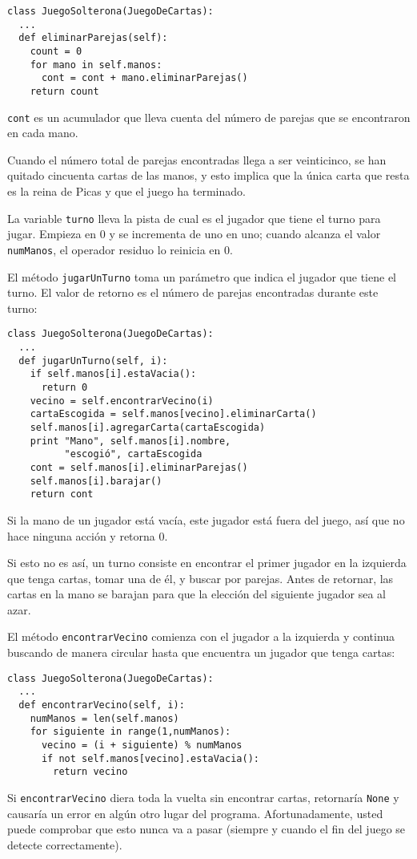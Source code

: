 \beforeverb
\begin{verbatim}
class JuegoSolterona(JuegoDeCartas):
  ...
  def eliminarParejas(self):
    count = 0
    for mano in self.manos:
      cont = cont + mano.eliminarParejas()
    return count
\end{verbatim}
\afterverb
%


\texttt{cont} es un acumulador que lleva cuenta del número
de parejas que se encontraron en cada mano.


Cuando el número total de parejas encontradas llega a ser 
veinticinco, se han quitado cincuenta cartas de las manos, y esto
implica que la única carta que resta es la reina de Picas
y que el juego ha terminado.

La variable \texttt{turno} lleva la pista de cual es el jugador
que tiene el turno para jugar. Empieza en 0 y se incrementa
de uno en uno; cuando alcanza el valor \texttt{numManos}, el 
operador residuo lo reinicia en 0.

El método  \texttt{jugarUnTurno} toma un parámetro que indica 
el jugador que tiene el turno. El valor de retorno es el 
número de parejas encontradas durante este turno:


\beforeverb
\begin{verbatim}
class JuegoSolterona(JuegoDeCartas):
  ...
  def jugarUnTurno(self, i):
    if self.manos[i].estaVacia():
      return 0
    vecino = self.encontrarVecino(i)
    cartaEscogida = self.manos[vecino].eliminarCarta()
    self.manos[i].agregarCarta(cartaEscogida)
    print "Mano", self.manos[i].nombre, 
          "escogió", cartaEscogida
    cont = self.manos[i].eliminarParejas()
    self.manos[i].barajar()
    return cont
\end{verbatim}
\afterverb
%
Si la mano de un jugador está vacía, este jugador está fuera del juego, 
así que no hace ninguna acción y retorna 0.

Si esto no es así, un turno consiste en encontrar el primer jugador
en la izquierda que tenga cartas, tomar una de él, y buscar por
parejas. Antes de retornar, las cartas en la mano se barajan para que
la elección del siguiente jugador sea al azar.

El método  \texttt{encontrarVecino} comienza con el jugador a la izquierda
y continua buscando de manera circular hasta que encuentra un jugador
que tenga cartas:

\beforeverb
\begin{verbatim}
class JuegoSolterona(JuegoDeCartas):
  ...
  def encontrarVecino(self, i):
    numManos = len(self.manos)
    for siguiente in range(1,numManos):
      vecino = (i + siguiente) % numManos
      if not self.manos[vecino].estaVacia():
        return vecino
\end{verbatim}
\afterverb
%
Si  \texttt{encontrarVecino} diera toda la vuelta sin encontrar cartas,
retornaría  \texttt{None} y causaría un error en algún otro lugar del programa.
Afortunadamente, usted puede comprobar que esto nunca va a pasar (siempre y 
cuando el fin del juego se detecte correctamente).

